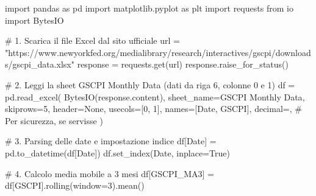 \documentclass[
  11pt,
  letterpaper,
  DIV=11,
  numbers=noendperiod]{scrartcl}
\newenvironment{Shaded}{\begin{snugshade}}{\end{snugshade}}
\newcommand{\CommentTok}[1]{\textcolor[rgb]{0.37,0.37,0.37}{#1}}
\newcommand{\DecValTok}[1]{\textcolor[rgb]{0.68,0.00,0.00}{#1}}
\newcommand{\ImportTok}[1]{\textcolor[rgb]{0.00,0.46,0.62}{#1}}
\newcommand{\NormalTok}[1]{\textcolor[rgb]{0.00,0.23,0.31}{#1}}
\newcommand{\OperatorTok}[1]{\textcolor[rgb]{0.37,0.37,0.37}{#1}}
\newcommand{\StringTok}[1]{\textcolor[rgb]{0.13,0.47,0.30}{#1}}
\newcommand{\VariableTok}[1]{\textcolor[rgb]{0.07,0.07,0.07}{#1}}
\begin{document}
\begin{Shaded}
\begin{Highlighting}[]
\ImportTok{import}\NormalTok{ pandas }\ImportTok{as}\NormalTok{ pd}
\ImportTok{import}\NormalTok{ matplotlib.pyplot }\ImportTok{as}\NormalTok{ plt}
\ImportTok{import}\NormalTok{ requests}
\ImportTok{from}\NormalTok{ io }\ImportTok{import}\NormalTok{ BytesIO}

\CommentTok{\# 1. Scarica il file Excel dal sito ufficiale}
\NormalTok{url }\OperatorTok{=} \StringTok{"https://www.newyorkfed.org/medialibrary/research/interactives/gscpi/downloads/gscpi\_data.xlsx"}
\NormalTok{response }\OperatorTok{=}\NormalTok{ requests.get(url)}
\NormalTok{response.raise\_for\_status()}

\CommentTok{\# 2. Leggi la sheet \textquotesingle{}GSCPI Monthly Data\textquotesingle{} (dati da riga 6, colonne 0 e 1)}
\NormalTok{df }\OperatorTok{=}\NormalTok{ pd.read\_excel(}
\NormalTok{    BytesIO(response.content),}
\NormalTok{    sheet\_name}\OperatorTok{=}\StringTok{\textquotesingle{}GSCPI Monthly Data\textquotesingle{}}\NormalTok{,}
\NormalTok{    skiprows}\OperatorTok{=}\DecValTok{5}\NormalTok{,}
\NormalTok{    header}\OperatorTok{=}\VariableTok{None}\NormalTok{,}
\NormalTok{    usecols}\OperatorTok{=}\NormalTok{[}\DecValTok{0}\NormalTok{, }\DecValTok{1}\NormalTok{],}
\NormalTok{    names}\OperatorTok{=}\NormalTok{[}\StringTok{\textquotesingle{}Date\textquotesingle{}}\NormalTok{, }\StringTok{\textquotesingle{}GSCPI\textquotesingle{}}\NormalTok{],}
\NormalTok{    decimal}\OperatorTok{=}\StringTok{\textquotesingle{},\textquotesingle{}}  \CommentTok{\# Per sicurezza, se servisse}
\NormalTok{)}

\CommentTok{\# 3. Parsing delle date e impostazione indice}
\NormalTok{df[}\StringTok{\textquotesingle{}Date\textquotesingle{}}\NormalTok{] }\OperatorTok{=}\NormalTok{ pd.to\_datetime(df[}\StringTok{\textquotesingle{}Date\textquotesingle{}}\NormalTok{])}
\NormalTok{df.set\_index(}\StringTok{\textquotesingle{}Date\textquotesingle{}}\NormalTok{, inplace}\OperatorTok{=}\VariableTok{True}\NormalTok{)}

\CommentTok{\# 4. Calcolo media mobile a 3 mesi}
\NormalTok{df[}\StringTok{\textquotesingle{}GSCPI\_MA3\textquotesingle{}}\NormalTok{] }\OperatorTok{=}\NormalTok{ df[}\StringTok{\textquotesingle{}GSCPI\textquotesingle{}}\NormalTok{].rolling(window}\OperatorTok{=}\DecValTok{3}\NormalTok{).mean()}


\end{Highlighting}
\end{Shaded}
\end{document}
